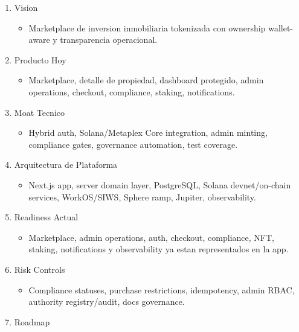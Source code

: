 \documentclass[
  10pt,
  letterpaper,
]{article}
\providecommand{\tightlist}{%
  \setlength{\itemsep}{0pt}\setlength{\parskip}{0pt}}
\begin{document}
\begin{enumerate}
\def\labelenumi{\arabic{enumi}.}
\tightlist
\item
  Vision

  \begin{itemize}
  \tightlist
  \item
    Marketplace de inversion inmobiliaria tokenizada con ownership
    wallet-aware y transparencia operacional.
  \end{itemize}
\item
  Producto Hoy

  \begin{itemize}
  \tightlist
  \item
    Marketplace, detalle de propiedad, dashboard protegido, admin
    operations, checkout, compliance, staking, notifications.
  \end{itemize}
\item
  Moat Tecnico

  \begin{itemize}
  \tightlist
  \item
    Hybrid auth, Solana/Metaplex Core integration, admin minting,
    compliance gates, governance automation, test coverage.
  \end{itemize}
\item
  Arquitectura de Plataforma

  \begin{itemize}
  \tightlist
  \item
    Next.js app, server domain layer, PostgreSQL, Solana devnet/on-chain
    services, WorkOS/SIWS, Sphere ramp, Jupiter, observability.
  \end{itemize}
\item
  Readiness Actual

  \begin{itemize}
  \tightlist
  \item
    Marketplace, admin operations, auth, checkout, compliance, NFT,
    staking, notifications y observability ya estan representados en la
    app.
  \end{itemize}
\item
  Risk Controls

  \begin{itemize}
  \tightlist
  \item
    Compliance statuses, purchase restrictions, idempotency, admin RBAC,
    authority registry/audit, docs governance.
  \end{itemize}
\item
  Roadmap


\end{enumerate}
\end{document}
